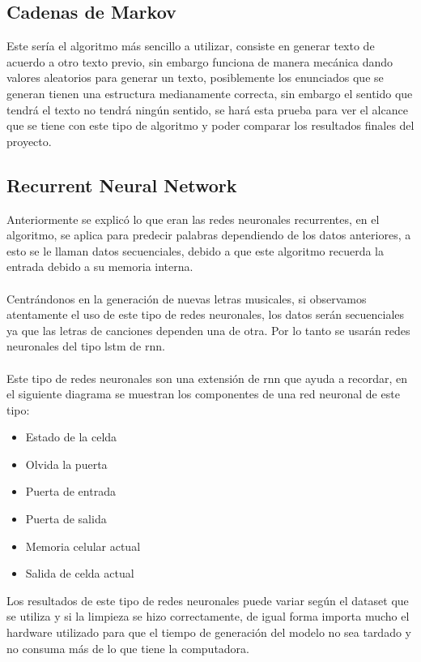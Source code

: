 \documentclass[12pt, a4paper, titlepage]{report}
\begin{document}
	   	\subsection{Cadenas de Markov}
	   	Este sería el algoritmo más sencillo a utilizar, consiste en generar texto de acuerdo a otro texto previo, sin embargo funciona de manera mecánica dando valores aleatorios para generar un texto, posiblemente los enunciados que se generan tienen una estructura medianamente correcta, sin embargo el sentido que tendrá el texto no tendrá ningún sentido, se hará esta prueba para ver el alcance que se tiene con este tipo de algoritmo y poder comparar los resultados finales del proyecto. 
	   	
	   	\subsection{Recurrent Neural Network}
	   	Anteriormente se explicó lo que eran las redes neuronales recurrentes, en el algoritmo, se aplica para predecir palabras dependiendo de los datos anteriores, a esto se le llaman datos secuenciales, debido a que este algoritmo recuerda la entrada debido a su memoria interna.\\\\
	   	Centrándonos en la generación de nuevas letras musicales, si observamos atentamente el uso de este tipo de redes neuronales, los datos serán secuenciales ya que las letras de canciones dependen una de otra. Por lo tanto se usarán redes neuronales del tipo \acrfull{lstm} de  \acrfull{rnn}.\\\\
	   	Este tipo de redes neuronales son una extensión de  \acrfull{rnn} que ayuda a recordar, en el siguiente diagrama se muestran los componentes de una red neuronal de este tipo:
	   	\begin{itemize}
	   	\item Estado de la celda
	   	\item Olvida la puerta
	   	\item Puerta de entrada
	   	\item Puerta de salida
	   	\item Memoria celular actual
	   	\item Salida de celda actual
	   	\end{itemize}
   		Los resultados de este tipo de redes neuronales puede variar según el dataset que se utiliza y si la limpieza se hizo correctamente, de igual forma importa mucho el hardware utilizado para que el tiempo de generación del modelo no sea tardado y no consuma más de lo que tiene la computadora.
\end{document}
